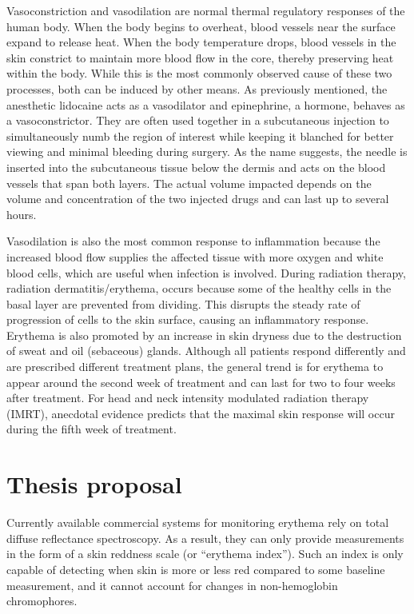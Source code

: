 Vasoconstriction and vasodilation are normal thermal regulatory responses of the human body.\cite{Kellogg2012} When the body begins to overheat, blood vessels near the surface expand to release heat. When the body temperature drops, blood vessels in the skin constrict to maintain more blood flow in the core, thereby preserving heat within the body. While this is the most commonly observed cause of these two processes, both can be induced by other means. As previously mentioned, the anesthetic lidocaine acts as a vasodilator and epinephrine, a hormone, behaves as a vasoconstrictor. They are often used together in a subcutaneous injection to simultaneously numb the region of interest while keeping it blanched for better viewing and minimal bleeding during surgery. As the name suggests, the needle is inserted into the subcutaneous tissue below the dermis and acts on the blood vessels that span both layers. The actual volume impacted depends on the volume and concentration of the two injected drugs and can last up to several hours.

Vasodilation is also the most common response to inflammation because the increased blood flow supplies the affected tissue with more oxygen and white blood cells, which are useful when infection is involved. During radiation therapy, radiation dermatitis/erythema, occurs because some of the healthy cells in the basal layer are prevented from dividing.\cite{Fitzgerald2008} This disrupts the steady rate of progression of cells to the skin surface, causing an inflammatory response.\cite{Simonen1998} Erythema is also promoted by an increase in skin dryness due to the destruction of sweat and oil (sebaceous) glands. Although all patients respond differently and are prescribed different treatment plans, the general trend is for erythema to appear around the second week of treatment and can last for two to four weeks after treatment. For head and neck intensity modulated radiation therapy (IMRT), anecdotal evidence predicts that the maximal skin response will occur during the fifth week of treatment.

\section{Thesis proposal}
Currently available commercial systems for monitoring erythema rely on total diffuse reflectance spectroscopy. As a result, they can only provide measurements in the form of a skin reddness scale (or ``erythema index''). Such an index is only capable of detecting when skin is more or less red compared to some baseline measurement, and it cannot account for changes in non-hemoglobin chromophores.

